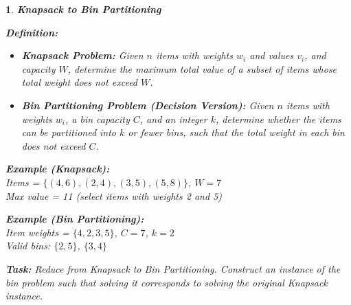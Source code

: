 \documentclass[%
addpoints]{exam}
\theoremstyle{problem}
\newtheorem{p}{}
\begin{document}
\begin{p}
\textbf{Knapsack to Bin Partitioning}

\textbf{Definition:}
\begin{itemize}
\item \textbf{Knapsack Problem:} Given $n$ items with weights $w_i$ and values $v_i$, and capacity $W$, determine the maximum total value of a subset of items whose total weight does not exceed $W$.
\item \textbf{Bin Partitioning Problem (Decision Version):} Given $n$ items with weights $w_i$, a bin capacity $C$, and an integer $k$, determine whether the items can be partitioned into $k$ or fewer bins, such that the total weight in each bin does not exceed $C$.
\end{itemize}

\textbf{Example (Knapsack):}\\
Items = $\{(4,6), (2,4), (3,5), (5,8)\}$, $W = 7$\\
Max value = 11 (select items with weights 2 and 5)

\textbf{Example (Bin Partitioning):}\\
Item weights = $\{4, 2, 3, 5\}$, $C = 7$, $k = 2$\\
Valid bins: $\{2, 5\}$, $\{3, 4\}$

\textbf{Task:} Reduce from Knapsack to Bin Partitioning. Construct an instance of the bin problem such that solving it corresponds to solving the original Knapsack instance.
\hfill \end{p}
\end{document}
